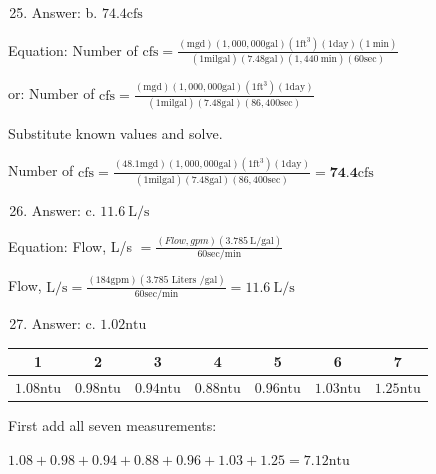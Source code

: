 \documentclass[10pt]{article}
\begin{document}
\begin{enumerate}
  \setcounter{enumi}{24}
  \item Answer: b. $74.4 \mathrm{cfs}$
\end{enumerate}

Equation: Number of $\mathrm{cfs}=\frac{(\mathrm{mgd})(1,000,000 \mathrm{gal})\left(1 \mathrm{ft}^{3}\right)(1 \mathrm{day})(1 \mathrm{~min})}{(1 \mathrm{mil} \mathrm{gal})(7.48 \mathrm{gal})(1,440 \mathrm{~min})(60 \mathrm{sec})}$

or: Number of $\mathrm{cfs}=\frac{(\mathrm{mgd})(1,000,000 \mathrm{gal})\left(1 \mathrm{ft}^{3}\right)(1 \mathrm{day})}{(1 \mathrm{mil} \mathrm{gal})(7.48 \mathrm{gal})(86,400 \mathrm{sec})}$

Substitute known values and solve.

Number of $\mathrm{cfs}=\frac{(48.1 \mathrm{mgd})(1,000,000 \mathrm{gal})\left(1 \mathrm{ft}^{3}\right)(1 \mathrm{day})}{(1 \mathrm{mil} \mathrm{gal})(7.48 \mathrm{gal})(86,400 \mathrm{sec})}=\mathbf{7 4 . 4} \mathrm{cfs}$

\begin{enumerate}
  \setcounter{enumi}{25}
  \item Answer: c. $11.6 \mathrm{~L} / \mathrm{s}$
\end{enumerate}

Equation: Flow, L/s $=\frac{(F l o w, g p m)(3.785 \mathrm{~L} / \mathrm{gal})}{60 \mathrm{sec} / \mathrm{min}}$

Flow, $\mathrm{L} / \mathrm{s}=\frac{(184 \mathrm{gpm})(3.785 \text { Liters } / \mathrm{gal})}{60 \mathrm{sec} / \mathrm{min}}=11.6 \mathrm{~L} / \mathrm{s}$

\begin{enumerate}
  \setcounter{enumi}{26}
  \item Answer: c. $1.02 \mathrm{ntu}$
\end{enumerate}

\begin{tabular}{|c|c|c|c|c|c|c|}
\hline
1 & 2 & 3 & 4 & 5 & 6 & 7 \\
\hline
$1.08 \mathrm{ntu}$ & $0.98 \mathrm{ntu}$ & $0.94 \mathrm{ntu}$ & $0.88 \mathrm{ntu}$ & $0.96 \mathrm{ntu}$ & $1.03 \mathrm{ntu}$ & $1.25 \mathrm{ntu}$ \\
\hline
\end{tabular}

First add all seven measurements:

$1.08+0.98+0.94+0.88+0.96+1.03+1.25=7.12 \mathrm{ntu}$
\end{document}
